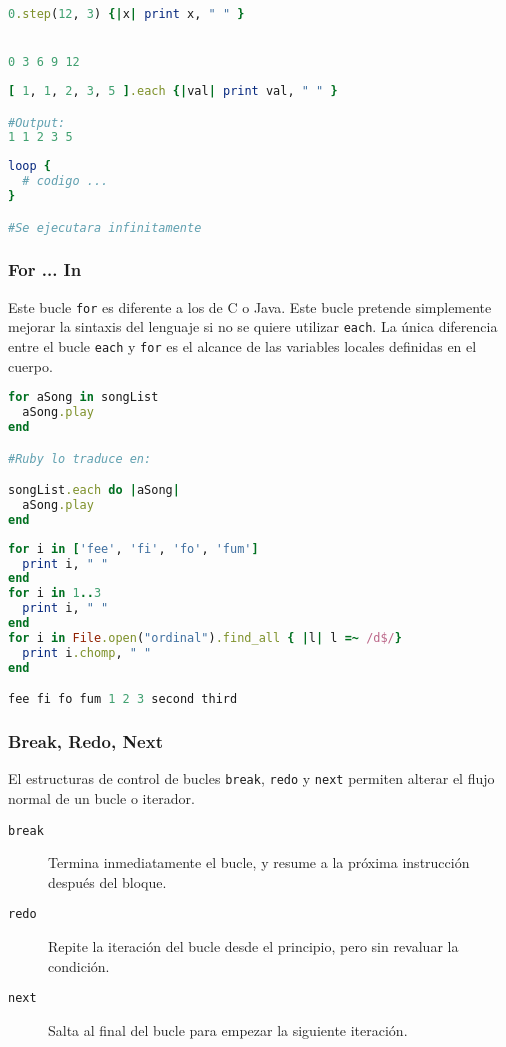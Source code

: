 \begin{lstlisting}[language=Ruby]
0.step(12, 3) {|x| print x, " " }


0 3 6 9 12
\end{lstlisting}

\begin{lstlisting}[language=Ruby]
[ 1, 1, 2, 3, 5 ].each {|val| print val, " " }

#Output:
1 1 2 3 5
\end{lstlisting}

\begin{lstlisting}[language=Ruby]
loop {
  # codigo ...
}

#Se ejecutara infinitamente
\end{lstlisting}

\subsubsection{For ... In}
Este bucle \texttt{for} es diferente a los de C o Java. Este bucle pretende simplemente mejorar la sintaxis del lenguaje si no se quiere utilizar \texttt{each}. La única diferencia entre el bucle \texttt{each} y \texttt{for} es el alcance de las variables locales definidas en el cuerpo.

\begin{lstlisting}[language=Ruby]
for aSong in songList
  aSong.play
end

#Ruby lo traduce en:

songList.each do |aSong|
  aSong.play
end
\end{lstlisting}

\begin{lstlisting}[language=Ruby]
for i in ['fee', 'fi', 'fo', 'fum']
  print i, " "
end
for i in 1..3
  print i, " "
end
for i in File.open("ordinal").find_all { |l| l =~ /d$/}
  print i.chomp, " "
end

fee fi fo fum 1 2 3 second third
\end{lstlisting}

\subsubsection{Break, Redo, Next}
El estructuras de control de bucles \texttt{break}, \texttt{redo} y \texttt{next} permiten alterar el flujo normal de un bucle o iterador.
\begin{description}
	\item[\texttt{break}] Termina inmediatamente el bucle, y resume a la próxima instrucción después del bloque.
	\item[\texttt{redo}] Repite la iteración del bucle desde el principio, pero sin revaluar la condición.
	\item[\texttt{next}] Salta al final del bucle para empezar la siguiente iteración. 
\end{description}

